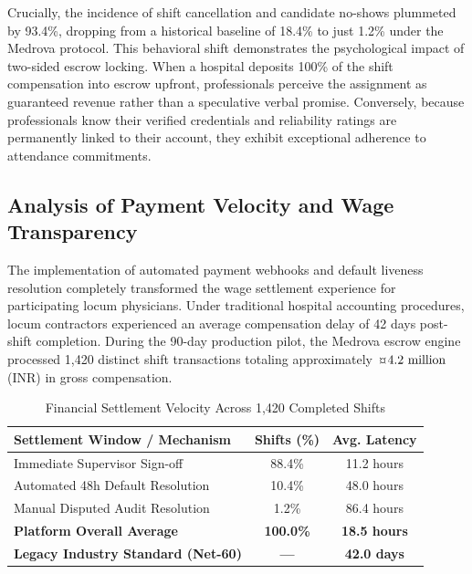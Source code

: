 \documentclass[conference]{IEEEtran}
\begin{document}
Crucially, the incidence of shift cancellation and candidate no-shows plummeted by 93.4\%, dropping from a historical baseline of 18.4\% to just 1.2\% under the Medrova protocol. This behavioral shift demonstrates the psychological impact of two-sided escrow locking. When a hospital deposits 100\% of the shift compensation into escrow upfront, professionals perceive the assignment as guaranteed revenue rather than a speculative verbal promise. Conversely, because professionals know their verified credentials and reliability ratings are permanently linked to their account, they exhibit exceptional adherence to attendance commitments.

\subsection{Analysis of Payment Velocity and Wage Transparency}
The implementation of automated payment webhooks and default liveness resolution completely transformed the wage settlement experience for participating locum physicians. Under traditional hospital accounting procedures, locum contractors experienced an average compensation delay of 42 days post-shift completion. During the 90-day production pilot, the Medrova escrow engine processed 1,420 distinct shift transactions totaling approximately $\text{\textcurrency}4.2\text{ million}$ (INR) in gross compensation.

\begin{table}[htbp]
\caption{Financial Settlement Velocity Across 1,420 Completed Shifts}
\begin{center}
\begin{tabular}{l c c}
\toprule
\textbf{Settlement Window / Mechanism} & \textbf{Shifts (\%)} & \textbf{Avg. Latency} \\
\midrule
Immediate Supervisor Sign-off & 88.4\% & 11.2 hours \\
Automated 48h Default Resolution & 10.4\% & 48.0 hours \\
Manual Disputed Audit Resolution & 1.2\% & 86.4 hours \\
\midrule
\textbf{Platform Overall Average} & \textbf{100.0\%} & \textbf{18.5 hours} \\
\textbf{Legacy Industry Standard (Net-60)} & \textbf{---} & \textbf{42.0 days} \\
\bottomrule
\end{tabular}
\label{tab:payout_velocity}
\end{center}
\end{table}
\end{document}
